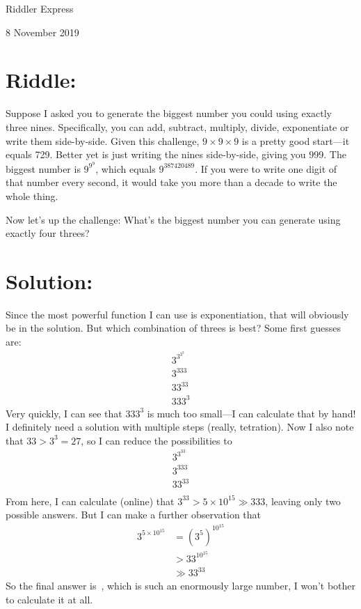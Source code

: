 \documentclass{article}
\begin{document}
\pagestyle{empty} %

\begin{center}
{\LARGE Riddler Express}

\vspace{0.15in}

{\Large 8 November 2019}
\end{center}


\section*{Riddle:}

Suppose I asked you to generate the biggest number you could using exactly three nines.
Specifically, you can add, subtract, multiply, divide, exponentiate or write them side-by-side.
Given this challenge, $9\times9\times9$ is a pretty good start---it equals 729.
Better yet is just writing the nines side-by-side, giving you 999.
The biggest number is $9^{9^{9}}$, which equals $9^{387420489}$.
If you were to write one digit of that number every second, it would take you more than a decade to write the whole thing.

Now let’s up the challenge: What’s the biggest number you can generate using exactly four threes?


\section*{Solution:}

Since the most powerful function I can use is exponentiation, that will obviously be in the solution.
But which combination of threes is best?
Some first guesses are:
\begin{align*}
3^{3^{3^{3}}} \\
3^{333} \\
33^{33} \\
333^{3}
\end{align*}
Very quickly, I can see that $333^{3}$ is much too small---I can calculate that by hand!
I definitely need a solution with multiple steps (really, tetration).
Now I also note that $33>3^{3}=27$, so I can reduce the possibilities to
\begin{align*}
3^{3^{33}} \\
3^{333} \\
33^{33} \\
\end{align*}
From here, I can calculate (online) that $3^{33}>5\times10^{15}\gg 333$, leaving only two possible answers.
But I can make a further observation that
\begin{align*}
3^{5\times10^{15}} &= \left(3^{5}\right)^{10^{15}} \\
 &> 33^{10^{15}} \\
 &\gg 33^{33}
\end{align*}
So the final answer is
\,, which is such an enormously large number, I won't bother to calculate it at all.
\end{document}
